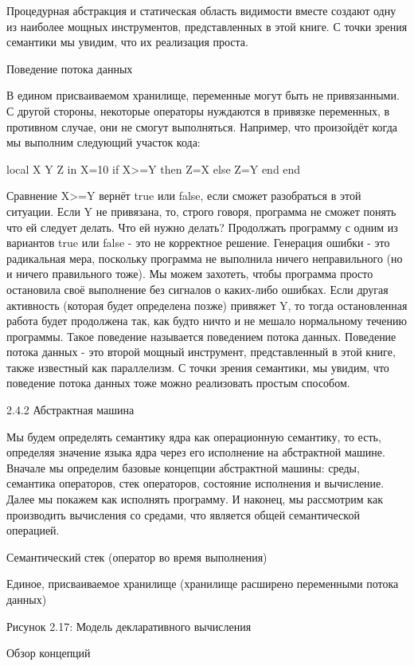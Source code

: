 Процедурная абстракция и статическая область видимости вместе создают одну из наиболее мощных инструментов, представленных в этой книге. С точки зрения семантики мы увидим, что их реализация проста.

Поведение потока данных

В едином присваиваемом хранилище, переменные могут быть не привязанными. С другой стороны, некоторые операторы нуждаются в привязке переменных, в противном случае, они не смогут выполняться. Например, что произойдёт когда мы выполним следующий участок кода:

local X Y Z in
X=10
if X>=Y then Z=X else Z=Y end
end

Сравнение X>=Y вернёт true или false, если сможет разобраться в этой ситуации. Если Y не привязана, то, строго говоря, программа не сможет понять что ей следует делать. Что ей нужно делать? Продолжать программу с одним из вариантов true или false - это не корректное решение. Генерация ошибки - это радикальная мера, поскольку программа не выполнила ничего неправильного (но и ничего правильного тоже). Мы можем захотеть, чтобы программа просто остановила своё выполнение без сигналов о каких-либо ошибках. Если другая активность (которая будет определена позже) привяжет Y, то тогда остановленная работа будет продолжена так, как будто ничто и не мешало нормальному течению программы. Такое поведение называется поведением потока данных. Поведение потока данных - это второй мощный инструмент, представленный в этой книге, также известный как параллелизм. С точки зрения семантики, мы увидим, что поведение потока данных тоже можно реализовать простым способом.

2.4.2 Абстрактная машина

Мы будем определять семантику ядра как операционную семантику, то есть, определяя значение языка ядра через его исполнение на абстрактной машине. Вначале мы определим базовые концепции абстрактной машины: среды, семантика операторов, стек операторов, состояние исполнения и вычисление. Далее мы покажем как исполнять программу. И наконец, мы рассмотрим как производить вычисления со средами, что является общей семантической операцией.

Семантический стек (оператор во время выполнения)

Единое, присваиваемое хранилище (хранилище расширено переменными потока данных)

Рисунок 2.17: Модель декларативного вычисления

Обзор концепций

